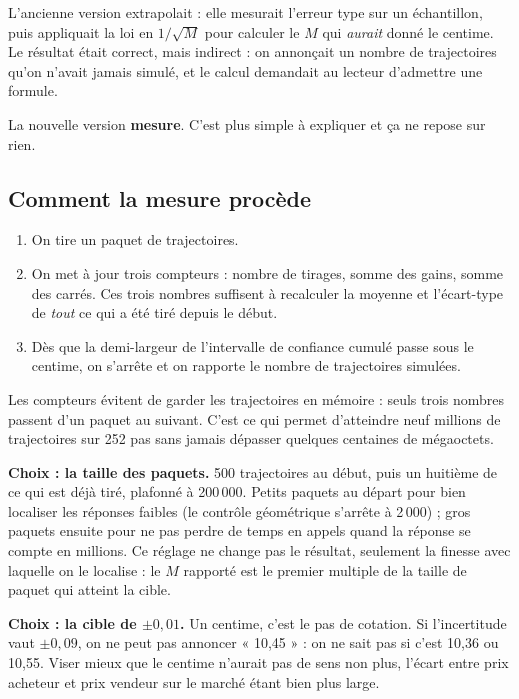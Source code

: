 \documentclass[11pt,a4paper]{article}
\begin{document}
L'ancienne version extrapolait : elle mesurait l'erreur type sur un échantillon,
puis appliquait la loi en $1/\sqrt{M}$ pour calculer le $M$ qui \emph{aurait}
donné le centime. Le résultat était correct, mais indirect : on annonçait un
nombre de trajectoires qu'on n'avait jamais simulé, et le calcul demandait au
lecteur d'admettre une formule.

La nouvelle version \textbf{mesure}. C'est plus simple à expliquer et ça ne
repose sur rien.

\subsection{Comment la mesure procède}

\begin{enumerate}\setlength\itemsep{1pt}
\item On tire un paquet de trajectoires.
\item On met à jour trois compteurs : nombre de tirages, somme des gains, somme
      des carrés. Ces trois nombres suffisent à recalculer la moyenne et
      l'écart-type de \emph{tout} ce qui a été tiré depuis le début.
\item Dès que la demi-largeur de l'intervalle de confiance cumulé passe sous le
      centime, on s'arrête et on rapporte le nombre de trajectoires simulées.
\end{enumerate}

Les compteurs évitent de garder les trajectoires en mémoire : seuls trois
nombres passent d'un paquet au suivant. C'est ce qui permet d'atteindre neuf
millions de trajectoires sur 252 pas sans jamais dépasser quelques centaines de
mégaoctets.

\begin{choix}
\textbf{Choix : la taille des paquets.} 500 trajectoires au début, puis un
huitième de ce qui est déjà tiré, plafonné à 200\,000. Petits paquets au départ
pour bien localiser les réponses faibles (le contrôle géométrique s'arrête à
2\,000) ; gros paquets ensuite pour ne pas perdre de temps en appels quand la
réponse se compte en millions. Ce réglage ne change pas le résultat, seulement
la finesse avec laquelle on le localise : le $M$ rapporté est le premier
multiple de la taille de paquet qui atteint la cible.
\end{choix}

\begin{choix}
\textbf{Choix : la cible de $\pm 0{,}01$.} Un centime, c'est le pas de
cotation. Si l'incertitude vaut $\pm 0{,}09$, on ne peut pas annoncer
« 10,45 » : on ne sait pas si c'est 10,36 ou 10,55. Viser mieux que le centime
n'aurait pas de sens non plus, l'écart entre prix acheteur et prix vendeur sur
le marché étant bien plus large.
\end{choix}
\end{document}
